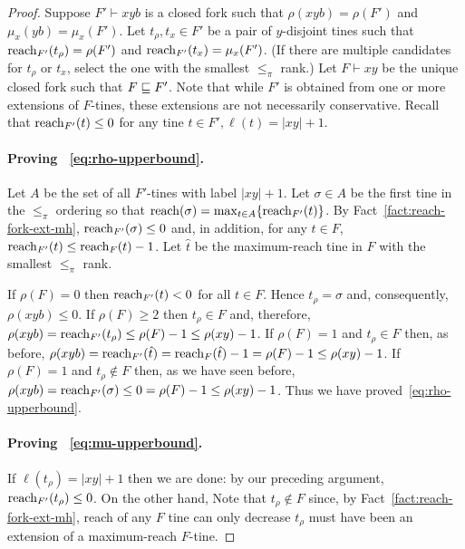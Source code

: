 \begin{proof}
  Suppose $F'\vdash xyb$ is a closed fork such that 
  $\rho(xyb)=\rho(F')$ and $\mu_x(yb)=\mu_x(F')$. 
  Let $t_\rho, t_x \in F'$ be a pair of $y$-disjoint tines such that $\operatorname{reach}_{F'}(t_\rho)=\rho(F')$ and $\operatorname{reach}_{F'}(t_x)=\mu_x(F')$. 
  (If there are multiple candidates for $t_\rho$ or $t_x$, 
  select the one with the smallest $\leq_\pi$ rank.)
  Let $F\vdash xy$ be the unique closed fork such that $F\sqsubseteq F'$.  
  Note that while $F'$ is obtained from one or more extensions 
  of $F$-tines, 
  these extensions are not necessarily conservative. 
  Recall that $\operatorname{reach}_{F'}(t) \leq 0$ for any tine $t \in F', \ell(t) = |xy| + 1$.

  \paragraph{Proving ~\eqref{eq:rho-upperbound}.} 
  Let $A$ be the set of all $F'$-tines with label $|xy| + 1$.
  Let $\sigma \in A$ be the first tine in the $\leq_\pi$ ordering so that $\operatorname{reach}(\sigma) = \max_{t \in A}\{\operatorname{reach}_{F'}(t)\}$.
  By Fact~\ref{fact:reach-fork-ext-mh}, 
  $\operatorname{reach}_{F'}(\sigma) \leq 0$ and, 
  in addition, for any $t \in F$, 
  $\operatorname{reach}_{F'}(t) \leq \operatorname{reach}_F(t) - 1$.   
  Let $\hat{t}$ be the maximum-reach tine in $F$ 
  with the smallest $\leq_\pi$ rank.

  If $\rho(F) = 0$ then 
  $\operatorname{reach}_{F'}(t) < 0$ for all $t \in F$. 
  Hence $t_\rho = \sigma$ and, consequently, 
  $\rho(xyb) \leq 0$. 
  If $\rho(F) \geq 2$ then $t_\rho \in F$
  and, therefore, 
  $\rho(xyb) = \operatorname{reach}_{F'}(t_\rho) \leq \rho(F) - 1 \leq \rho(xy) - 1$. 
  If $\rho(F) = 1$ and $t_\rho \in F$ then, 
  as before, 
  $\rho(xyb) = \operatorname{reach}_{F'}(\hat{t}) = \operatorname{reach}_{F}(\hat{t}) - 1 = \rho(F) - 1 \leq \rho(xy) - 1$.
  If $\rho(F) = 1$ and $t_\rho \not \in F$ then, as we have seen before, 
  $\rho(xyb) = \operatorname{reach}_{F'}(\sigma) \leq 0 = \rho(F) - 1\leq \rho(xy) - 1$.
  Thus we have proved~\eqref{eq:rho-upperbound}.


  \paragraph{Proving ~\eqref{eq:mu-upperbound}.} 
  If $\ell(t_\rho) = |xy| + 1$ then we are done: 
  by our preceding argument, $\operatorname{reach}_{F'}(t_\rho) \leq 0$. 
  On the other hand, 
  Note that $t_\rho \not \in F$ since, by Fact~\ref{fact:reach-fork-ext-mh}, reach of any $F$ tine can only decrease
  $t_\rho$ must have been an extension of a maximum-reach $F$-tine.


\end{proof}
